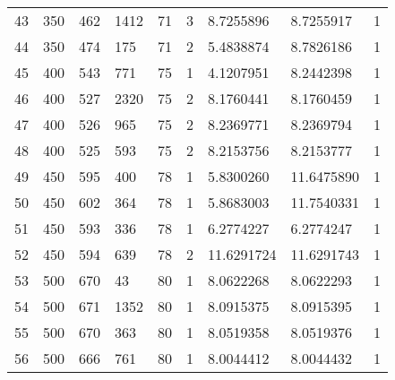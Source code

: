 \begin{longtable}{lllllllll}
  43 & 350 & 462 & 1412 & 71 & 3 & 8.7255896 & 8.7255917 & 1 \\
  44 & 350 & 474 & 175 & 71 & 2 & 5.4838874 & 8.7826186 & 1 \\
  45 & 400 & 543 & 771 & 75 & 1 & 4.1207951 & 8.2442398 & 1 \\
  46 & 400 & 527 & 2320 & 75 & 2 & 8.1760441 & 8.1760459 & 1 \\
  47 & 400 & 526 & 965 & 75 & 2 & 8.2369771 & 8.2369794 & 1 \\
  48 & 400 & 525 & 593 & 75 & 2 & 8.2153756 & 8.2153777 & 1 \\
  49 & 450 & 595 & 400 & 78 & 1 & 5.8300260 & 11.6475890 & 1 \\
  50 & 450 & 602 & 364 & 78 & 1 & 5.8683003 & 11.7540331 & 1 \\
  51 & 450 & 593 & 336 & 78 & 1 & 6.2774227 & 6.2774247 & 1 \\
  52 & 450 & 594 & 639 & 78 & 2 & 11.6291724 & 11.6291743 & 1 \\
  53 & 500 & 670 & 43 & 80 & 1 & 8.0622268 & 8.0622293 & 1 \\
  54 & 500 & 671 & 1352 & 80 & 1 & 8.0915375 & 8.0915395 & 1 \\
  55 & 500 & 670 & 363 & 80 & 1 & 8.0519358 & 8.0519376 & 1 \\
  56 & 500 & 666 & 761 & 80 & 1 & 8.0044412 & 8.0044432 & 1
  \end{longtable}

